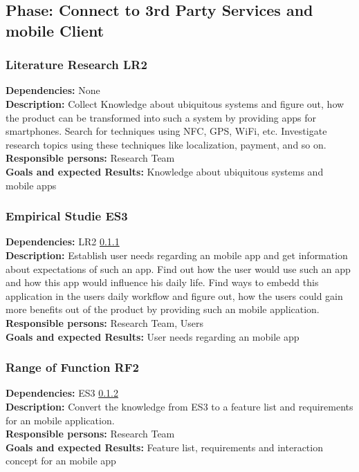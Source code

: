 \documentclass[a4paper,11pt]{article}
\begin{document}
\subsection{Phase: Connect to 3rd Party Services and mobile Client}
\label{sect:workplan:3rdpartiesandmobileclient}

\subsubsection{Literature Research LR2}
\label{sect:workplan:phase3:lr2}
\textbf{Dependencies:} None\\
\textbf{Description:} Collect Knowledge about ubiquitous systems and figure out, how the product can be transformed into such a system by providing apps for smartphones. Search for techniques using NFC, GPS, WiFi, etc. Investigate research topics using these techniques like localization, payment, and so on.\\
\textbf{Responsible persons:} Research Team\\
\textbf{Goals and expected Results:} Knowledge about ubiquitous systems and mobile apps\\

\subsubsection{Empirical Studie ES3}
\label{sect:workplan:phase3:es3}
\textbf{Dependencies:} LR2 \ref{sect:workplan:phase3:lr2}\\
\textbf{Description:} Establish user needs regarding an mobile app and get information about expectations of such an app. Find out how the user would use such an app and how this app would influence his daily life. Find ways to embedd this application in the users daily workflow and figure out, how the users could gain more benefits out of the product by providing such an mobile application.\\
\textbf{Responsible persons:} Research Team, Users\\
\textbf{Goals and expected Results:} User needs regarding an mobile app\\

\subsubsection{Range of Function RF2}
\label{sect:workplan:phase3:rf2}
\textbf{Dependencies:} ES3 \ref{sect:workplan:phase3:es3}\\
\textbf{Description:} Convert the knowledge from ES3 to a feature list and requirements for an mobile application.\\
\textbf{Responsible persons:} Research Team\\
\textbf{Goals and expected Results:} Feature list, requirements and interaction concept for an mobile app\\
\end{document}
